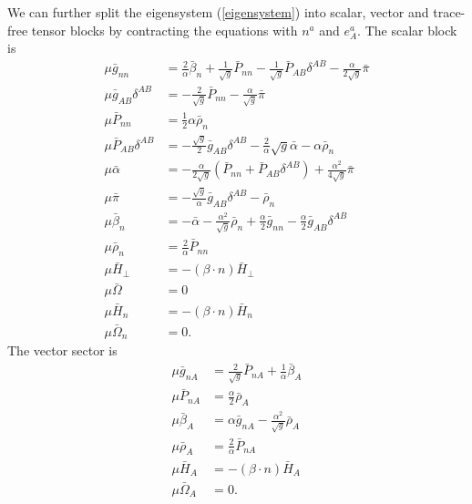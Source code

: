\documentclass[letterpaper,nofootinbib,prd,amsmath,onecolumn]{revtex4-1}
\begin{document}
We can further split the eigensystem (\ref{eigensystem}) into scalar, vector and trace-free tensor blocks by contracting the equations with $n^{a}$ and $e^{a}_{A}$. The scalar block is
\begin{subequations}
\begin{align}
\mu {\bar g}_{nn} & = \frac{2}{\alpha}{\bar \beta}_{n} + \frac{1}{\sqrt{g}}{\bar P}_{nn} - \frac{1}{\sqrt{g}}{\bar P}_{AB}\delta^{AB} - \frac{\alpha}{2\sqrt{g}}{\bar \pi}\\
\mu {\bar g}_{AB}\delta^{AB} & = - \frac{2}{\sqrt{g}}{\bar P}_{nn} - \frac{\alpha}{\sqrt{g}}{\bar \pi}\\
\mu {\bar P}_{nn} & = \frac{1}{2}\alpha{\bar \rho}_{n}\\
\mu {\bar P}_{AB}\delta^{AB} & = -\frac{\sqrt{g}}{2}{\bar g}_{AB}\delta^{AB} - \frac{2}{\alpha}\sqrt{g} {\bar \alpha} - \alpha {\bar \rho}_{n}\\
\mu {\bar \alpha} & = - \frac{\alpha}{2\sqrt{g}}\left({\bar P}_{nn} + {\bar P}_{AB}\delta^{AB}\right) + \frac{\alpha^{2}}{4\sqrt{g}}{\bar \pi}\\
\mu {\bar \pi} & = -\frac{\sqrt{g}}{\alpha}{\bar g}_{AB}\delta^{AB} - {\bar \rho}_{n}\\
\mu {\bar \beta}_{n} & = - {\bar \alpha} - \frac{\alpha^{2}}{\sqrt{g}}{\bar \rho}_{n} + \frac{\alpha}{2}{\bar g}_{nn} - \frac{\alpha}{2}{\bar g}_{AB}\delta^{AB}\\
\mu {\bar \rho}_{n} & = \frac{2}{\alpha}{\bar P}_{nn}\\
\mu {\bar H}_{\perp} & = - \left( \beta \cdot n \right){\bar H}_{\perp}\\
\mu {\bar \Omega} & = 0\\
\mu {\bar H}_{n} & = - \left( \beta \cdot n \right){\bar H}_{n}\\
\mu {\bar \Omega}_{n} & = 0.
\end{align}
\end{subequations}
The vector sector is
\begin{subequations}
\begin{align}
\mu {\bar g}_{nA} & = \frac{2}{\sqrt{g}}{\bar P}_{nA} + \frac{1}{\alpha}{\bar \beta}_{A}\\
\mu {\bar P}_{nA} & = \frac{\alpha}{2}{\bar \rho}_{A}\\
\mu {\bar \beta}_{A} & = \alpha {\bar g}_{nA} - \frac{\alpha^{2}}{\sqrt{g}}{\bar \rho}_{A}\\
\mu {\bar \rho}_{A} & = \frac{2}{\alpha}{\bar P}_{nA}\\
\mu {\bar H}_{A} & = - \left( \beta \cdot n \right) {\bar H}_{A}\\
\mu {\bar \Omega}_{A} & = 0.
\end{align}
\end{subequations}
\end{document}
